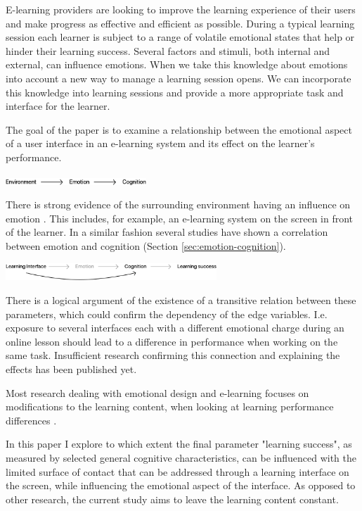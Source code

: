 E-learning providers are looking to improve the learning experience of their users and make progress as effective and efficient as possible. 
During a typical learning session each learner is subject to a range of volatile emotional states that help or hinder their learning success. 
Several factors and stimuli, both internal and external, can influence emotions. 
When we take this knowledge about emotions into account a new way to manage a learning session opens. We can incorporate this knowledge into learning sessions and provide a more appropriate task and interface for the learner.

The goal of the paper is to examine a relationship between the emotional aspect of a user interface in an e-learning system and its effect on the learner's performance.


\begin{center}
	\includegraphics[width=200px]{graphics/relation1.png}
\end{center}
 
There is strong evidence of the surrounding environment having an influence on emotion \cite{Johnson2000, Arockiam2013, Bertamini2013}. This includes, for example, an e-learning system on the screen in front of the learner. In a similar fashion several studies have shown a correlation between emotion and cognition (Section \ref{sec:emotion-cognition}).

\begin{center}
\includegraphics[width=300px]{graphics/relation2.png}
\end{center}

There is a logical argument of the existence of a transitive relation between these parameters, which could confirm the dependency of the edge variables. 
I.e. exposure to several interfaces each with a different emotional charge during an online lesson should lead to a difference in performance when working on the same task.
Insufficient research confirming this connection and explaining the effects has been published yet. 

Most research dealing with emotional design and e-learning focuses on modifications to the learning content, when looking at learning performance differences \cite{Plass2014, Plass2016}.

In this paper I explore to which extent the final parameter "learning success", as measured by selected general cognitive characteristics, can be influenced with the limited surface of contact that can be addressed through a learning interface on the screen, while influencing the emotional aspect of the interface. As opposed to other research, the current study aims to leave the learning content constant.
